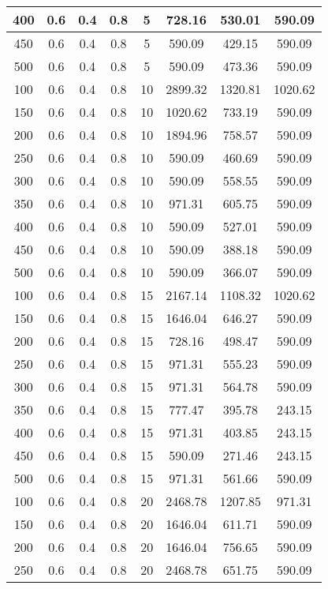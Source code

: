 \documentclass[a4paper, 12pt]{extreport}
\begin{document}
\begin{itemize}
\begin{longtable}{|c|c|c|c|c|c|c|c|}
			400 & 0.6 & 0.4 & 0.8 & 5 & 728.16 & 530.01 & 590.09 \\\hline
			450 & 0.6 & 0.4 & 0.8 & 5 & 590.09 & 429.15 & 590.09 \\\hline
			500 & 0.6 & 0.4 & 0.8 & 5 & 590.09 & 473.36 & 590.09 \\\hline
			100 & 0.6 & 0.4 & 0.8 & 10 & 2899.32 & 1320.81 & 1020.62 \\\hline
			150 & 0.6 & 0.4 & 0.8 & 10 & 1020.62 & 733.19 & 590.09 \\\hline
			200 & 0.6 & 0.4 & 0.8 & 10 & 1894.96 & 758.57 & 590.09 \\\hline
			250 & 0.6 & 0.4 & 0.8 & 10 & 590.09 & 460.69 & 590.09 \\\hline
			300 & 0.6 & 0.4 & 0.8 & 10 & 590.09 & 558.55 & 590.09 \\\hline
			350 & 0.6 & 0.4 & 0.8 & 10 & 971.31 & 605.75 & 590.09 \\\hline
			400 & 0.6 & 0.4 & 0.8 & 10 & 590.09 & 527.01 & 590.09 \\\hline
			450 & 0.6 & 0.4 & 0.8 & 10 & 590.09 & 388.18 & 590.09 \\\hline
			500 & 0.6 & 0.4 & 0.8 & 10 & 590.09 & 366.07 & 590.09 \\\hline
			100 & 0.6 & 0.4 & 0.8 & 15 & 2167.14 & 1108.32 & 1020.62 \\\hline
			150 & 0.6 & 0.4 & 0.8 & 15 & 1646.04 & 646.27 & 590.09 \\\hline
			200 & 0.6 & 0.4 & 0.8 & 15 & 728.16 & 498.47 & 590.09 \\\hline
			250 & 0.6 & 0.4 & 0.8 & 15 & 971.31 & 555.23 & 590.09 \\\hline
			300 & 0.6 & 0.4 & 0.8 & 15 & 971.31 & 564.78 & 590.09 \\\hline
			350 & 0.6 & 0.4 & 0.8 & 15 & 777.47 & 395.78 & 243.15 \\\hline
			400 & 0.6 & 0.4 & 0.8 & 15 & 971.31 & 403.85 & 243.15 \\\hline
			450 & 0.6 & 0.4 & 0.8 & 15 & 590.09 & 271.46 & 243.15 \\\hline
			500 & 0.6 & 0.4 & 0.8 & 15 & 971.31 & 561.66 & 590.09 \\\hline
			100 & 0.6 & 0.4 & 0.8 & 20 & 2468.78 & 1207.85 & 971.31 \\\hline
			150 & 0.6 & 0.4 & 0.8 & 20 & 1646.04 & 611.71 & 590.09 \\\hline
			200 & 0.6 & 0.4 & 0.8 & 20 & 1646.04 & 756.65 & 590.09 \\\hline
			250 & 0.6 & 0.4 & 0.8 & 20 & 2468.78 & 651.75 & 590.09 \\\hline

\end{longtable}
\end{itemize}
\end{document}
